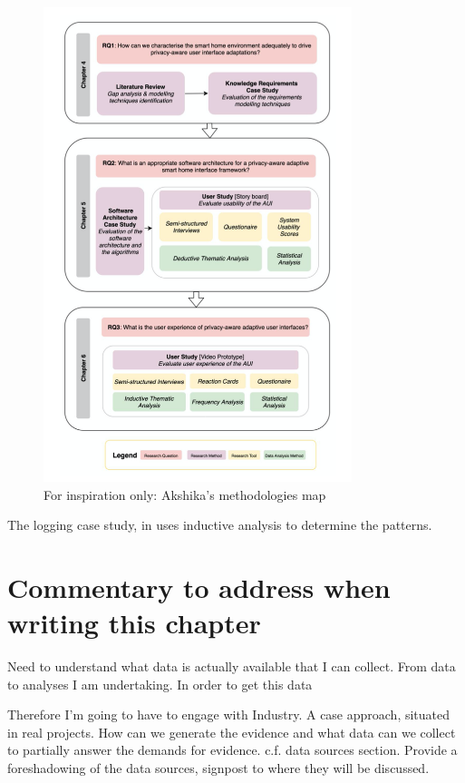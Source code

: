 \begin{figure}
    \centering
    \includegraphics[width=9cm]{images/ephemeral-images-remove-pre-publication/Akshikas-methodology-diagram-from-his-thesis.png}
    \caption{For inspiration only: Akshika's methodologies map}
    \label{fig:akshikas-methodologies-map}
\end{figure}

\hrulefill
\clearpage


The logging case study, in  uses inductive analysis to determine the patterns. 


\dotfill

\section*{Commentary to address when writing this chapter}
Need to understand what data is actually available that I can collect.
From data to analyses I am undertaking.
In order to get this data 

Therefore I'm going to have to engage with Industry. A case approach, situated in real projects.
How can we generate the evidence and what data can we collect to partially answer the demands for evidence. c.f. data sources section. Provide a foreshadowing of the data sources, signpost to where they will be discussed.

